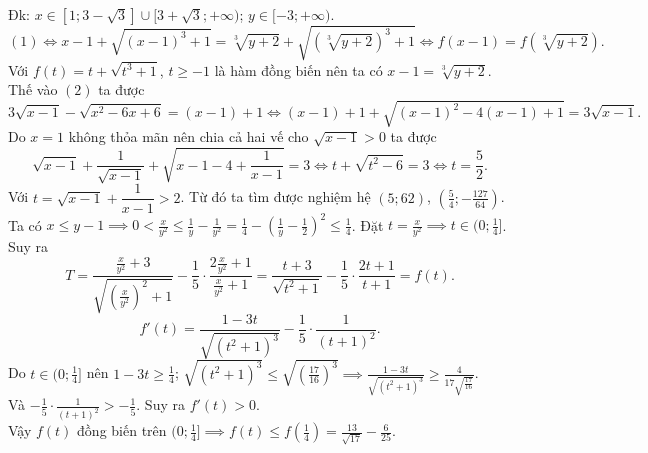 \hda 
Đk: $x\in [1;3-\sqrt{3}]\cup [3+\sqrt 3;+\infty)$; $y\in[-3;+\infty)$.\\
$$ (1)\iff  x-1+\sqrt{(x-1)^3+1}=\sqrt[3]{y+2}+\sqrt{(\sqrt[3]{y+2})^3+1}\iff  f(x-1)=f(\sqrt[3]{y+2}). $$
Với $f(t)=t+\sqrt{t^3+1}$, $t\ge -1$  là hàm đồng biến nên ta có $x-1=\sqrt[3]{y+2}$. Thế vào $(2)$ ta được
$$ 3\sqrt{x-1}-\sqrt{x^2-6x+6}=(x-1)+1\iff  (x-1)+1+\sqrt{(x-1)^2-4(x-1)+1}=3\sqrt{x-1}. $$
Do $x=1$ không thỏa mãn nên chia cả hai vế cho $\sqrt{x-1}>0$ ta được
$$ \sqrt{x-1}+\dfrac{1}{\sqrt{x-1}}+\sqrt{x-1-4+\dfrac 1{x-1}}=3\iff  t+\sqrt{t^2-6}=3\iff  t=\dfrac 52. $$
Với $t=\sqrt{x-1}+\dfrac{1}{x-1}>2$. Từ đó ta tìm được nghiệm hệ $(5;62)$, $\left(\frac 54;-\frac{127}{64}\right)$.
\hda 
Ta có $x\le y-1\implies  0<\frac x{y^2}\le\frac 1y-\frac 1{y^2}=\frac 14-\left(\frac 1y-\frac 12\right)^2\le \frac 14$. Đặt $t=\frac{x}{y^2}\implies  t\in(0;\frac 14]$.\\
Suy ra
$$ T=\frac{\frac{x}{y^2}+3}{\sqrt{\left(\frac{x}{y^2}\right)^2+1}}-\frac 15\cdot\frac{2\frac{x}{y^2}+1}{\frac{x}{y^2}+1}=\frac{t+3}{\sqrt{t^2+1}}-\frac 15\cdot\frac{2t+1}{t+1}=f(t). $$
$$ f'(t)=\frac{1-3t}{\sqrt{(t^2+1)^3}}-\frac 15\cdot\frac{1}{(t+1)^2}. $$
Do $t\in(0;\frac 14]$ nên $1-3t\ge \frac 14$; $\sqrt{(t^2+1)^3}\le \sqrt{\left(\frac{17}{16}\right)^3}\implies  \frac{1-3t}{\sqrt{(t^2+1)^3}}\ge \frac{4}{17\sqrt{\frac{17}{16}}}$.\\
Và $-\frac 15\cdot\frac{1}{(t+1)^2}>-\frac 15$. Suy ra $f'(t)>0$.\\
Vậy $f(t)$ đồng biến trên $(0;\frac 14]\implies  f(t)\le f(\frac 14)=\frac{13}{\sqrt{17}}-\frac 6{25}$.